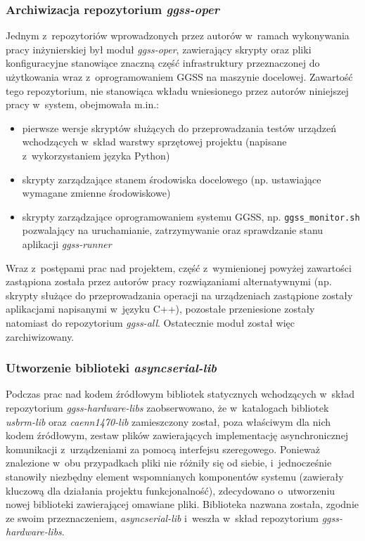 \subsubsection{Archiwizacja repozytorium \emph{ggss-oper}}
Jednym z~repozytoriów wprowadzonych przez autorów w~ramach wykonywania pracy inżynierskiej był moduł \emph{ggss-oper}, zawierający skrypty oraz pliki konfiguracyjne stanowiące znaczną część infrastruktury przeznaczonej do użytkowania wraz z~oprogramowaniem GGSS na maszynie docelowej. Zawartość tego repozytorium, nie stanowiąca wkładu wniesionego przez autorów niniejszej pracy w~system, obejmowała m.in.: 
\begin{itemize}
    \item pierwsze wersje skryptów służących do przeprowadzania testów urządzeń wchodzących w~skład warstwy sprzętowej projektu (napisane z~wykorzystaniem języka Python)
    \item skrypty zarządzające stanem środowiska docelowego (np. ustawiające wymagane zmienne środowiskowe)
    \item skrypty zarządzające oprogramowaniem systemu GGSS, np. \lstinline{ggss_monitor.sh} pozwalający na uruchamianie, zatrzymywanie oraz sprawdzanie stanu aplikacji \emph{ggss-runner}
\end{itemize}
Wraz z~postępami prac nad projektem, część z~wymienionej powyżej zawartości zastąpiona została przez autorów pracy rozwiązaniami alternatywnymi (np. skrypty służące do przeprowadzania operacji na urządzeniach zastąpione zostały aplikacjami napisanymi w~języku C++), pozostałe przeniesione zostały natomiast do repozytorium \emph{ggss-all}. Ostatecznie moduł został więc zarchiwizowany.


\subsubsection{Utworzenie biblioteki \emph{asyncserial-lib}}
Podczas prac nad kodem źródłowym bibliotek statycznych wchodzących w~skład repozytorium \emph{ggss-hardware-libs} zaobserwowano, że w~katalogach bibliotek \emph{usbrm-lib} oraz \emph{caenn1470-lib} zamieszczony został, poza właściwym dla nich kodem źródłowym, zestaw plików zawierających implementację asynchronicznej komunikacji z~urządzeniami za pomocą interfejsu szeregowego. Ponieważ znalezione w~obu przypadkach pliki nie różniły się od siebie, i~jednocześnie stanowiły niezbędny element wspomnianych komponentów systemu (zawierały kluczową dla działania projektu funkcjonalność), zdecydowano o~utworzeniu nowej biblioteki zawierającej omawiane pliki. Biblioteka nazwana została, zgodnie ze swoim przeznaczeniem, \emph{asyncserial-lib} i~weszła w~skład repozytorium \emph{ggss-hardware-libs}.



